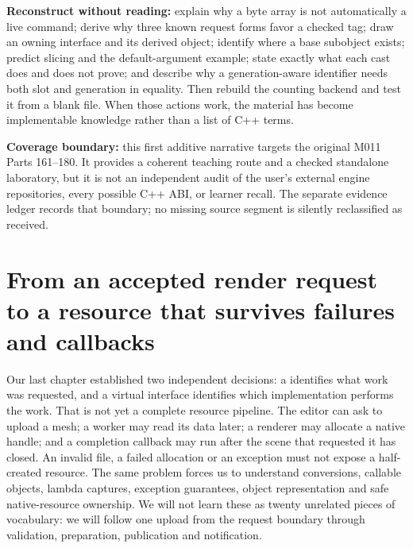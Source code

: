 \textbf{Reconstruct without reading:} explain why a byte array is not automatically a live command; derive why three known request forms favor a checked tag; draw an owning interface and its derived object; identify where a base subobject exists; predict slicing and the default-argument example; state exactly what each cast does and does not prove; and describe why a generation-aware identifier needs both slot and generation in equality. Then rebuild the counting backend and test it from a blank file. When those actions work, the material has become implementable knowledge rather than a list of C++ terms.

\textbf{Coverage boundary:} this first additive narrative targets the original M011 Parts 161--180. It provides a coherent teaching route and a checked standalone laboratory, but it is not an independent audit of the user's external engine repositories, every possible C++ ABI, or learner recall. The separate evidence ledger records that boundary; no missing source segment is silently reclassified as received.

\section{From an accepted render request to a resource that survives failures and callbacks}\label{01-foundations-i-ch004-from-an-accepted-render-request-to-a-resource-that-survives-failures-and-callbacks}

\hypertarget{01-foundations-i-ch004-from-an-accepted-render-request-to-a-resource-that-survives-failures-and-callbacks}{}

Our last chapter established two independent decisions: a  identifies what work was requested, and a virtual  interface identifies which implementation performs the work. That is not yet a complete resource pipeline. The editor can ask to upload a mesh; a worker may read its data later; a renderer may allocate a native handle; and a completion callback may run after the scene that requested it has closed. An invalid file, a failed allocation or an exception must not expose a half-created resource. The same problem forces us to understand conversions, callable objects, lambda captures, exception guarantees, object representation and safe native-resource ownership. We will not learn these as twenty unrelated pieces of vocabulary: we will follow one upload from the request boundary through validation, preparation, publication and notification.


